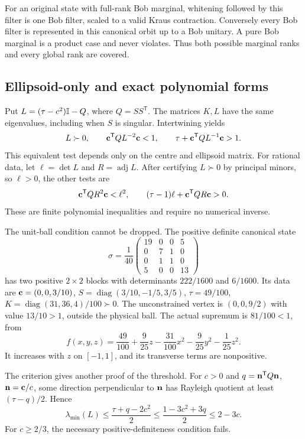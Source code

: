 For an original state with full-rank Bob marginal, whitening followed by this
filter is one Bob filter, scaled to a valid Kraus contraction. Conversely
every Bob filter is represented in this canonical orbit up to a Bob unitary.
A pure Bob marginal is a product case and never violates. Thus both
possible marginal ranks and every global rank are covered.

\subsection{Ellipsoid-only and exact polynomial forms}
Put $L=(\tau-c^2)\mathbb I-Q$, where $Q=SS^{\mathsf T}$. The matrices $K,L$ have
the same eigenvalues, including when $S$ is singular. Intertwining yields
\begin{equation}\label{eq:geometriccriterion}
L\succ0,\qquad \mathbf c^{\mathsf T}QL^{-2}\mathbf c<1,\qquad
\tau+\mathbf c^{\mathsf T}QL^{-1}\mathbf c>1.
\end{equation}
This equivalent test depends only on the centre and ellipsoid matrix.
For rational data, let $\ell=\det L$ and $R=\operatorname{adj}L$.
After certifying $L\succ0$ by principal minors, so $\ell>0$, the other tests are
\[
\mathbf c^{\mathsf T}QR^2\mathbf c<\ell^2,\qquad
(\tau-1)\ell+\mathbf c^{\mathsf T}QR\mathbf c>0.
\]
These are finite polynomial inequalities and require no numerical inverse.

The unit-ball condition cannot be dropped. The positive definite canonical state
\[
\sigma=\frac1{40}\begin{pmatrix}19&0&0&5\\0&7&1&0\\0&1&1&0\\5&0&0&13\end{pmatrix}
\]
has two positive $2\times2$ blocks with determinants $222/1600$ and $6/1600$.
Its data are $\mathbf c=(0,0,3/10)$, $S=\operatorname{diag}(3/10,-1/5,3/5)$,
$\tau=49/100$, $K=\operatorname{diag}(31,36,4)/100\succ0$.
The unconstrained vertex is $(0,0,9/2)$ with value $13/10>1$, outside the
physical ball. The actual supremum is $81/100<1$, from
\[
f(x,y,z)=\frac{49}{100}+\frac9{25}z-\frac{31}{100}x^2
-\frac9{25}y^2-\frac1{25}z^2.
\]
It increases with $z$ on $[-1,1]$, and its transverse terms are nonpositive.

The criterion gives another proof of the threshold. For $c>0$ and
$q=\mathbf n^{\mathsf T}Q\mathbf n$, $\mathbf n=\mathbf c/c$, some direction perpendicular to $\mathbf n$
has Rayleigh quotient at least $(\tau-q)/2$. Hence
\[
\lambda_{\min}(L)\leq\frac{\tau+q-2c^2}{2}
\leq\frac{1-3c^2+3q}{2}\leq2-3c.
\]
For $c\geq2/3$, the necessary positive-definiteness condition fails.


